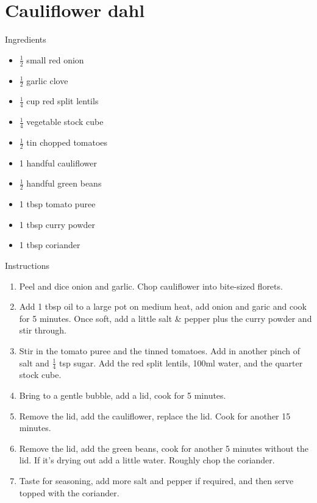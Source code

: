 \documentclass[../dinner.tex]{subfiles}
\begin{document}
	\pagestyle{fancy}
	\fancyhf{}
	\newpage
	\section{Cauliflower dahl}
	\lhead{}
	{\Large Ingredients}
	\begin{multicols}{2}
		\begin{itemize}
			\item \(\frac{1}{2}\) small red onion
			\item \(\frac{1}{2}\) garlic clove
			\item \(\frac{1}{4}\) cup red split lentils
			\item \(\frac{1}{4}\) vegetable stock cube
			\item \(\frac{1}{2}\) tin chopped tomatoes
		\end{itemize}
		\columnbreak
		\begin{itemize}
			\item 1 handful cauliflower
			\item \(\frac{1}{2}\) handful green beans
			\item 1 tbsp tomato puree
			\item 1 tbsp curry powder
			\item 1 tbsp coriander
		\end{itemize}
	\end{multicols}

	{\Large Instructions}
	\begin{enumerate}
		\item Peel and dice onion and garlic. Chop cauliflower into bite-sized florets. 
		\item Add 1 tbsp oil to a large pot on medium heat, add onion and garic and cook for 5 minutes. Once soft, add a little salt \& pepper plus the curry powder and stir through.
		\item Stir in the tomato puree and the tinned tomatoes. Add in another pinch of salt and \(\frac{1}{4}\) tsp sugar. Add the red split lentils, 100ml water, and the quarter stock cube.
		\item Bring to a gentle bubble, add a lid, cook for 5 minutes.
		\item Remove the lid, add the cauliflower, replace the lid. Cook for another 15 minutes.
		\item Remove the lid, add the green beans, cook for another 5 minutes without the lid. If it's drying out add a little water. Roughly chop the coriander.
		\item Taste for seasoning, add more salt and pepper if required, and then serve topped with the coriander.
	\end{enumerate}
\end{document}
